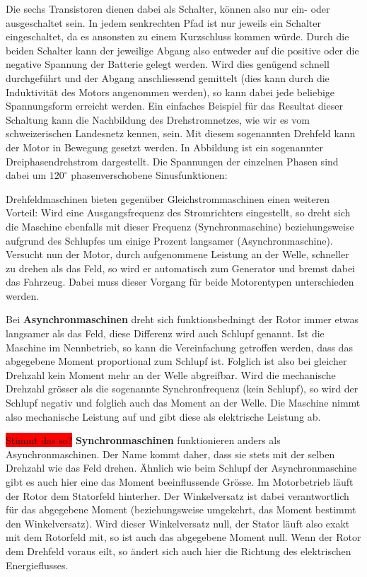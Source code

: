 Die sechs Transistoren dienen dabei als Schalter, können also nur ein- oder ausgeschaltet sein. In jedem senkrechten Pfad ist nur jeweils ein Schalter eingeschaltet, da es ansonsten zu einem Kurzschluss kommen würde. Durch die beiden Schalter kann der jeweilige Abgang also entweder auf die positive oder die negative Spannung der Batterie gelegt werden. Wird dies genügend schnell durchgeführt und der Abgang anschliessend gemittelt (dies kann durch die Induktivität des Motors angenommen werden), so kann dabei jede beliebige Spannungsform erreicht werden. Ein einfaches Beispiel für das Resultat dieser Schaltung kann die Nachbildung des Drehstromnetzes, wie wir es vom schweizerischen Landesnetz kennen, sein. Mit diesem sogenannten Drehfeld kann der Motor in Bewegung gesetzt werden. In Abbildung  ist ein sogenannter Dreiphasendrehstrom dargestellt. Die Spannungen der einzelnen Phasen sind dabei um $120^\circ$ phasenverschobene Sinusfunktionen:

Drehfeldmaschinen bieten gegenüber Gleichstrommaschinen einen weiteren Vorteil: Wird eine Ausgangsfrequenz des Stromrichters eingestellt, so dreht sich die Maschine ebenfalls mit dieser Frequenz (Synchronmaschine) beziehungsweise aufgrund des Schlupfes um einige Prozent langsamer (Asynchronmaschine). Versucht nun der Motor, durch aufgenommene Leistung an der Welle, schneller zu drehen als das Feld, so wird er automatisch zum Generator und bremst dabei das Fahrzeug. Dabei muss dieser Vorgang für beide Motorentypen unterschieden werden.

Bei \textbf{Asynchronmaschinen} dreht sich funktionsbedningt der Rotor immer etwas langsamer als das Feld, diese Differenz wird auch Schlupf genannt. Ist die Maschine im Nennbetrieb, so kann die Vereinfachung getroffen werden, dass das abgegebene Moment proportional zum Schlupf ist. Folglich ist also bei gleicher Drehzahl kein Moment mehr an der Welle abgreifbar. Wird die mechanische Drehzahl grösser als die sogenannte Synchronfrequenz (kein Schlupf), so wird der Schlupf negativ und folglich auch das Moment an der Welle. Die Maschine nimmt also mechanische Leistung auf und gibt diese als elektrische Leistung ab.

\colorbox{red}{Stimmt das so?}
\textbf{Synchronmaschinen} funktionieren anders als Asynchronmaschinen. Der Name kommt daher, dass sie stets mit der selben Drehzahl wie das Feld drehen. Ähnlich wie beim Schlupf der Asynchronmaschine gibt es auch hier eine das Moment beeinflussende Grösse. Im Motorbetrieb läuft der Rotor dem Statorfeld hinterher. Der Winkelversatz ist dabei verantwortlich für das abgegebene Moment (beziehungsweise umgekehrt, das Moment bestimmt den Winkelversatz). Wird dieser Winkelversatz null, der Stator läuft also exakt mit dem Rotorfeld mit, so ist auch das abgegebene Moment null. Wenn der Rotor dem Drehfeld voraus eilt, so ändert sich auch hier die Richtung des elektrischen Energieflusses.

